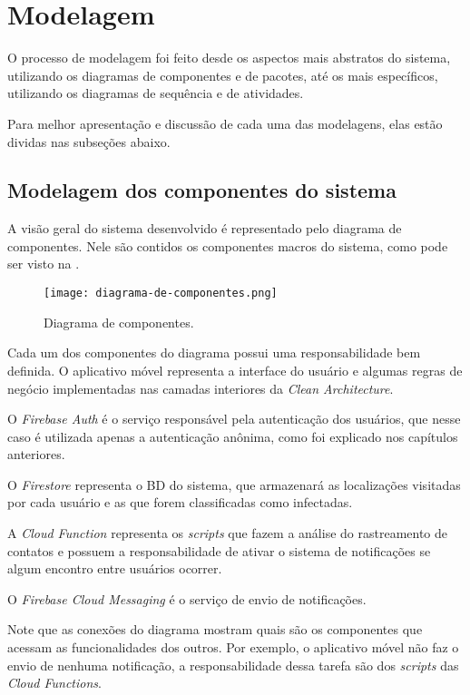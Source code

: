 \section{Modelagem}\label{sec:modelagem}
O processo de modelagem foi feito desde os aspectos mais abstratos do sistema, utilizando os diagramas de componentes e de pacotes, até os mais específicos, utilizando os diagramas de sequência e de atividades.

Para melhor apresentação e discussão de cada uma das modelagens, elas estão dividas nas subseções abaixo.

\subsection{Modelagem dos componentes do sistema}
A visão geral do sistema desenvolvido é representado pelo diagrama de componentes. Nele são contidos os componentes macros do sistema, como pode ser visto na .

\begin{figure}[!htb]
  \centering
  \texttt{[image: diagrama-de-componentes.png]}
  \caption{Diagrama de componentes.}
  \label{fig:diagramacomponentes}
\end{figure}

Cada um dos componentes do diagrama possui uma responsabilidade bem definida. O aplicativo móvel representa a interface do usuário e algumas regras de negócio implementadas nas camadas interiores da \textit{Clean Architecture}.

O \textit{Firebase Auth} é o serviço responsável pela autenticação dos usuários, que nesse caso é utilizada apenas a autenticação anônima, como foi explicado nos capítulos anteriores.

O \textit{Firestore} representa o BD do sistema, que armazenará as localizações visitadas por cada usuário e as que forem classificadas como infectadas.

A \textit{Cloud Function} representa os \textit{scripts} que fazem a análise do rastreamento de contatos e possuem a responsabilidade de ativar o sistema de notificações se algum encontro entre usuários ocorrer.

O \textit{Firebase Cloud Messaging} é o serviço de envio de notificações.

Note que as conexões do diagrama mostram quais são os componentes que acessam as funcionalidades dos outros. Por exemplo, o aplicativo móvel não faz o envio de nenhuma notificação, a responsabilidade dessa tarefa são dos \textit{scripts} das \textit{Cloud Functions}.

